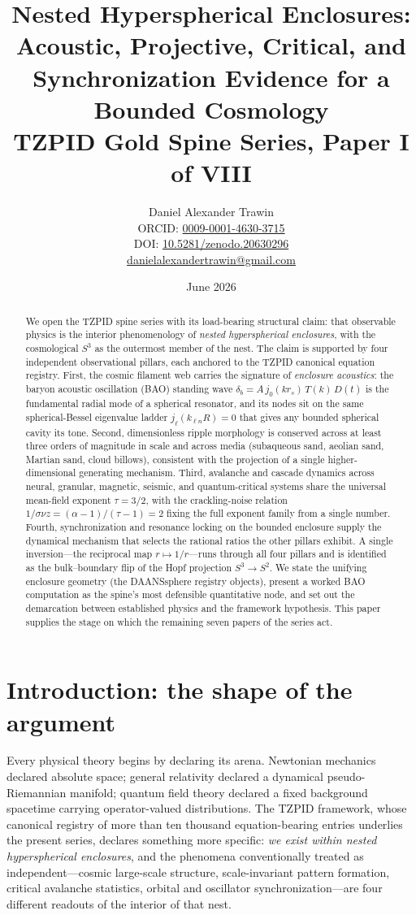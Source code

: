\documentclass[11pt]{article}
\title{Nested Hyperspherical Enclosures:\\ Acoustic, Projective, Critical, and Synchronization Evidence for a Bounded Cosmology\\[0.6em]
\large TZPID Gold Spine Series, Paper I of VIII}
\author{Daniel Alexander Trawin\\
\small ORCID: \href{https://orcid.org/0009-0001-4630-3715}{0009-0001-4630-3715}\\
\small DOI: \href{https://doi.org/10.5281/zenodo.20630296}{10.5281/zenodo.20630296}\\
\small \href{mailto:danielalexandertrawin@gmail.com}{danielalexandertrawin@gmail.com}}
\date{June 2026}
\theoremstyle{remark}
\begin{document}
\maketitle

\begin{abstract}
We open the TZPID spine series with its load-bearing structural claim: that observable physics is the interior phenomenology of \emph{nested hyperspherical enclosures}, with the cosmological $S^3$ as the outermost member of the nest. The claim is supported by four independent observational pillars, each anchored to the TZPID canonical equation registry. First, the cosmic filament web carries the signature of \emph{enclosure acoustics}: the baryon acoustic oscillation (BAO) standing wave $\delta_b = A\, j_0(k r_s)\, T(k)\, D(t)$ is the fundamental radial mode of a spherical resonator, and its nodes sit on the same spherical-Bessel eigenvalue ladder $j_\ell(k_{\ell n}R)=0$ that gives any bounded spherical cavity its tone. Second, dimensionless ripple morphology is conserved across at least three orders of magnitude in scale and across media (subaqueous sand, aeolian sand, Martian sand, cloud billows), consistent with the projection of a single higher-dimensional generating mechanism. Third, avalanche and cascade dynamics across neural, granular, magnetic, seismic, and quantum-critical systems share the universal mean-field exponent $\tau = 3/2$, with the crackling-noise relation $1/\sigma\nu z = (\alpha-1)/(\tau-1) = 2$ fixing the full exponent family from a single number. Fourth, synchronization and resonance locking on the bounded enclosure supply the dynamical mechanism that selects the rational ratios the other pillars exhibit. A single inversion---the reciprocal map $r \mapsto 1/r$---runs through all four pillars and is identified as the bulk--boundary flip of the Hopf projection $S^3 \to S^2$. We state the unifying enclosure geometry (the DAANSsphere registry objects), present a worked BAO computation as the spine's most defensible quantitative node, and set out the demarcation between established physics and the framework hypothesis. This paper supplies the stage on which the remaining seven papers of the series act.
\end{abstract}

\section{Introduction: the shape of the argument}
\label{sec:intro}

Every physical theory begins by declaring its arena. Newtonian mechanics declared absolute space; general relativity declared a dynamical pseudo-Riemannian manifold; quantum field theory declared a fixed background spacetime carrying operator-valued distributions. The TZPID framework, whose canonical registry of more than ten thousand equation-bearing entries underlies the present series, declares something more specific: \emph{we exist within nested hyperspherical enclosures}, and the phenomena conventionally treated as independent---cosmic large-scale structure, scale-invariant pattern formation, critical avalanche statistics, orbital and oscillator synchronization---are four different readouts of the interior of that nest.
\end{document}
